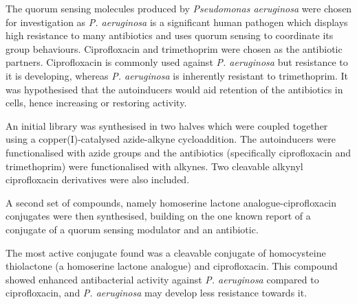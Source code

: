 The quorum sensing molecules produced by \textit{Pseudomonas aeruginosa} were chosen for investigation as \textit{P. aeruginosa} is a significant human pathogen\cite{Bodey1983} which displays high resistance to many antibiotics\cite{Poole2004} and uses quorum sensing to coordinate its group behaviours\cite{Dubern2008}. 
Ciprofloxacin and trimethoprim were chosen as the antibiotic partners.
Ciprofloxacin is commonly used against \textit{P. aeruginosa}\cite{Macgowan1999} but resistance to it is developing\cite{Su2010}, whereas \textit{P. aeruginosa} is inherently resistant to trimethoprim.
It was hypothesised that the autoinducers would aid retention of the antibiotics in cells, hence increasing or restoring activity.

An initial library was synthesised in two halves which were coupled together using a copper(I)-catalysed azide-alkyne cycloaddition\cite{Tornoe2002,Rostovtsev2002}. 
The autoinducers were functionalised with azide groups and the antibiotics (specifically ciprofloxacin and trimethoprim) were functionalised with alkynes. 
Two cleavable alkynyl ciprofloxacin derivatives were also included.

A second set of compounds, namely homoserine lactone analogue-ciprofloxacin conjugates were then synthesised, building on the one known report of a conjugate of a quorum sensing modulator and an antibiotic\cite{Ganguly2011}.

The most active conjugate found was a cleavable conjugate of homocysteine thiolactone (a homoserine lactone analogue) and ciprofloxacin. This compound showed enhanced antibacterial activity against \textit{P. aeruginosa} compared to ciprofloxacin, and \textit{P. aeruginosa} may develop less resistance towards it.


\newpage